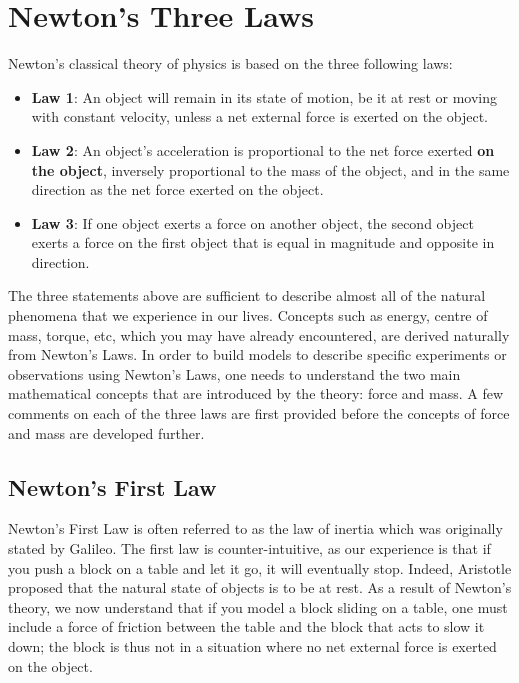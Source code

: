 \section{Newton's Three Laws}
Newton's classical theory of physics is based on the three following laws:
\begin{itemize}
\item \textbf{Law 1}: An object will remain in its state of motion, be it at rest or moving with constant velocity, unless a net external force is exerted on the object.
\item \textbf{Law 2}: An object's acceleration is proportional to the net force exerted \textbf{on the object}, inversely proportional to the mass of the object, and in the same direction as the net force exerted on the object.
\item \textbf{Law 3}: If one object exerts a force on another object, the second object exerts a force on the first object that is equal in magnitude and opposite in direction.
\end{itemize}
The three statements above are sufficient to describe almost all of the natural phenomena that we experience in our lives. Concepts such as energy, centre of mass, torque, etc, which you may have already encountered, are derived naturally from Newton's Laws. In order to build models to describe specific experiments or observations using Newton's Laws, one needs to understand the two main mathematical concepts that are introduced by the theory: force and mass. A few comments on each of the three laws are first provided before the concepts of force and mass are developed further.

\subsection{Newton's First Law}
Newton's First Law is often referred to as the law of inertia which was originally stated by Galileo. The first law is counter-intuitive, as our experience is that if you push a block on a table and let it go, it will eventually stop. Indeed, Aristotle proposed that the natural state of objects is to be at rest. As a result of Newton's theory, we now understand that if you model a block sliding on a table, one must include a force of friction between the table and the block that acts to slow it down; the block is thus not in a situation where no net external force is exerted on the object.

